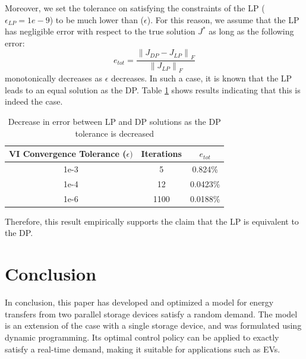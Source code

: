 \documentclass[conference]{IEEEtran}
\newcommand{\norm}[1]{\left\lVert#1\right\rVert}
\begin{document}
Moreover, we set the tolerance on satisfying the constraints of the LP ($\epsilon_{LP}=1e-9$) to be much lower than ($\epsilon$). For this reason, we assume that the LP has negligible error with respect to the true solution $J^{*}$ as long as the following error:
\begin{displaymath}
    e_{tot}=\frac{\norm{J_{DP}-J_{LP}}_{F}}{\norm{J_{LP}}_{F}}
\end{displaymath} monotonically decreases as $\epsilon$ decreases. In such a case, it is known that the LP leads to an equal solution as the DP. Table \ref{tab:DPerrorVsTolerance} shows results indicating that this is indeed the case.
\begin{table}%
	\begin{center}
		\begin{tabular}{|c|c|c|}
			\hline
			\textbf{VI Convergence Tolerance ($\epsilon)$}&\textbf{Iterations}&\textbf{$e_{tot}$} \\
			\hline
			1e-3& 5 & 0.824\% \\
			\hline
			1e-4& 12 & 0.0423\% \\
			\hline
			1e-6& 1100 & 0.0188\% \\
			\hline
		\end{tabular}
	\end{center}
	\caption{Decrease in error between LP and DP solutions as the DP tolerance is decreased}
	\label{tab:DPerrorVsTolerance}
\end{table} Therefore, this result empirically supports the claim that the LP is equivalent to the DP.




\section{Conclusion}
In conclusion, this paper has developed and optimized a model for energy transfers from two parallel storage devices satisfy a random demand. The model is an extension of the case with a single storage device, and was formulated using dynamic programming. Its optimal control policy can be applied to exactly satisfy a real-time demand, making it suitable for applications such as EVs.
\end{document}
